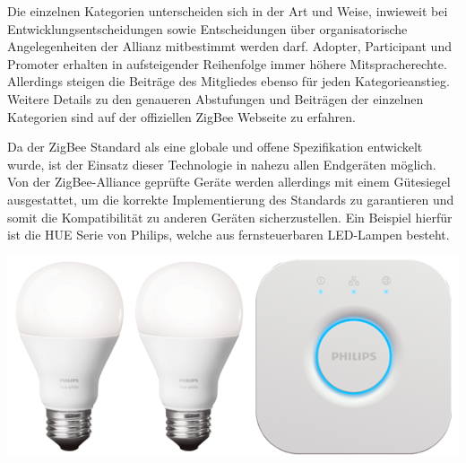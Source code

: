 \begin{multicols}{3}


Die einzelnen Kategorien unterscheiden sich in der Art und Weise, inwieweit bei Entwicklungsentscheidungen sowie Entscheidungen über organisatorische Angelegenheiten der Allianz mitbestimmt werden darf. Adopter, Participant und Promoter erhalten in aufsteigender Reihenfolge immer höhere Mitspracherechte. Allerdings steigen die Beiträge des Mitgliedes ebenso für jeden Kategorieanstieg.~\cite{zigbee.11} Weitere Details zu den genaueren Abstufungen und Beiträgen der einzelnen Kategorien sind auf der offiziellen ZigBee Webseite zu erfahren.
\par Da der ZigBee Standard als eine globale und offene Spezifikation entwickelt wurde, ist der Einsatz dieser Technologie in nahezu allen Endgeräten möglich. Von der ZigBee-Alliance  geprüfte Geräte werden allerdings mit einem Gütesiegel ausgestattet, um die korrekte Implementierung des Standards zu garantieren und somit die Kompatibilität zu anderen Geräten sicherzustellen. Ein Beispiel hierfür ist die HUE Serie von Philips, welche aus fernsteuerbaren LED-Lampen besteht.
\begin{Figure}
\includegraphics[width=\linewidth]{Kapitel/ZigBee/Grafiken/hue.png}
\label{fig:vorlage.zemath}
\end{Figure}


\end{multicols}
